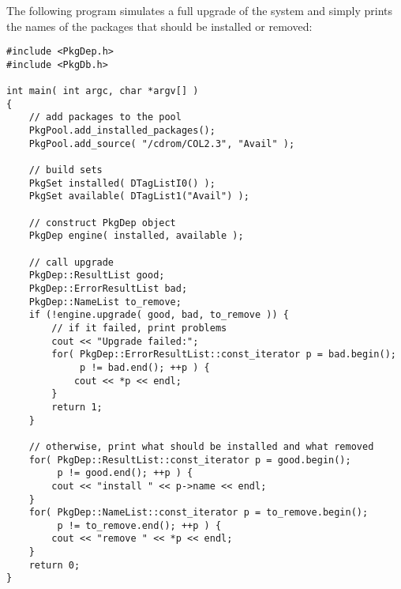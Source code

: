 \documentclass[10pt]{article}
\begin{document}
The following program simulates a full upgrade of the system and
simply prints the names of the packages that should be installed or
removed:

\begin{verbatim}
#include <PkgDep.h>
#include <PkgDb.h>

int main( int argc, char *argv[] )
{
    // add packages to the pool
    PkgPool.add_installed_packages();
    PkgPool.add_source( "/cdrom/COL2.3", "Avail" );

    // build sets
    PkgSet installed( DTagListI0() );
    PkgSet available( DTagList1("Avail") );

    // construct PkgDep object
    PkgDep engine( installed, available );

    // call upgrade
    PkgDep::ResultList good;
    PkgDep::ErrorResultList bad;
    PkgDep::NameList to_remove;
    if (!engine.upgrade( good, bad, to_remove )) {
        // if it failed, print problems
        cout << "Upgrade failed:";
        for( PkgDep::ErrorResultList::const_iterator p = bad.begin();
             p != bad.end(); ++p ) {
            cout << *p << endl;
        }
        return 1;
    }

    // otherwise, print what should be installed and what removed
    for( PkgDep::ResultList::const_iterator p = good.begin();
         p != good.end(); ++p ) {
        cout << "install " << p->name << endl;
    }
    for( PkgDep::NameList::const_iterator p = to_remove.begin();
         p != to_remove.end(); ++p ) {
        cout << "remove " << *p << endl;
    }
    return 0;
}
\end{verbatim}
\end{document}

